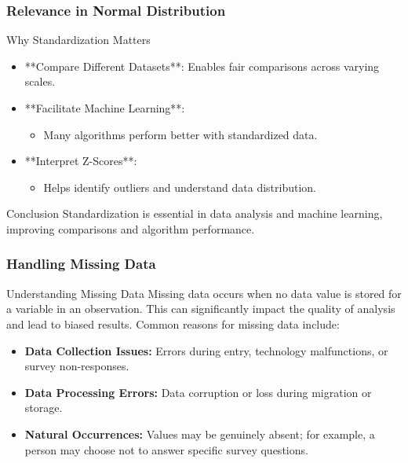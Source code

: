\documentclass[aspectratio=169]{beamer}
\begin{document}
\begin{frame}[fragile]
    \frametitle{Relevance in Normal Distribution}
    \begin{block}{Why Standardization Matters}
        \begin{itemize}
            \item **Compare Different Datasets**: Enables fair comparisons across varying scales.
            \item **Facilitate Machine Learning**:
                \begin{itemize}
                    \item Many algorithms perform better with standardized data.
                \end{itemize}
            \item **Interpret Z-Scores**:
                \begin{itemize}
                    \item Helps identify outliers and understand data distribution.
                \end{itemize}
        \end{itemize}
    \end{block}
    
    \begin{block}{Conclusion}
        Standardization is essential in data analysis and machine learning, improving comparisons and algorithm performance.
    \end{block}
\end{frame}

\begin{frame}[fragile]
    \frametitle{Handling Missing Data}
    \begin{block}{Understanding Missing Data}
        Missing data occurs when no data value is stored for a variable in an observation. This can significantly impact the quality of analysis and lead to biased results. Common reasons for missing data include:
    \end{block}
    \begin{itemize}
        \item \textbf{Data Collection Issues:} Errors during entry, technology malfunctions, or survey non-responses.
        \item \textbf{Data Processing Errors:} Data corruption or loss during migration or storage.
        \item \textbf{Natural Occurrences:} Values may be genuinely absent; for example, a person may choose not to answer specific survey questions.
    \end{itemize}
\end{frame}
\end{document}
